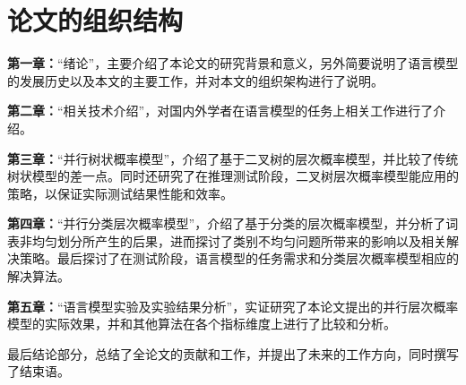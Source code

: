 \section{论文的组织结构}
\textbf{第一章：}``绪论''，主要介绍了本论文的研究背景和意义，另外简要说明了语言模型的发展历史以及本文的主要工作，并对本文的组织架构进行了说明。

\textbf{第二章：}``相关技术介绍''，对国内外学者在语言模型的任务上相关工作进行了介绍。

\textbf{第三章：}``并行树状概率模型''，介绍了基于二叉树的层次概率模型，并比较了传统树状模型的差一点。同时还研究了在推理测试阶段，二叉树层次概率模型能应用的策略，以保证实际测试结果性能和效率。


\textbf{第四章：}``并行分类层次概率模型''，介绍了基于分类的层次概率模型，并分析了词表非均匀划分所产生的后果，进而探讨了类别不均匀问题所带来的影响以及相关解决策略。最后探讨了在测试阶段，语言模型的任务需求和分类层次概率模型相应的解决算法。

\textbf{第五章：}``语言模型实验及实验结果分析''，实证研究了本论文提出的并行层次概率模型的实际效果，并和其他算法在各个指标维度上进行了比较和分析。

最后结论部分，总结了全论文的贡献和工作，并提出了未来的工作方向，同时撰写了结束语。



